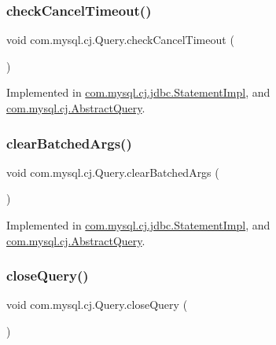 \subsubsection{\texorpdfstring{check\+Cancel\+Timeout()}{checkCancelTimeout()}}
{\footnotesize\ttfamily void com.\+mysql.\+cj.\+Query.\+check\+Cancel\+Timeout (\begin{DoxyParamCaption}{ }\end{DoxyParamCaption})}



Implemented in \mbox{\hyperlink{classcom_1_1mysql_1_1cj_1_1jdbc_1_1_statement_impl_a8409855892d4f4c55a35f3444f50825c}{com.\+mysql.\+cj.\+jdbc.\+Statement\+Impl}}, and \mbox{\hyperlink{classcom_1_1mysql_1_1cj_1_1_abstract_query_a995c89e6b09f3bff41729b384c9b1db3}{com.\+mysql.\+cj.\+Abstract\+Query}}.

\mbox{\label{interfacecom_1_1mysql_1_1cj_1_1_query_a72ab11f1338a67459c15b31d1e808b14}} 
\subsubsection{\texorpdfstring{clear\+Batched\+Args()}{clearBatchedArgs()}}
{\footnotesize\ttfamily void com.\+mysql.\+cj.\+Query.\+clear\+Batched\+Args (\begin{DoxyParamCaption}{ }\end{DoxyParamCaption})}



Implemented in \mbox{\hyperlink{classcom_1_1mysql_1_1cj_1_1jdbc_1_1_statement_impl_a42618e455d715cde9a92efbc6922b252}{com.\+mysql.\+cj.\+jdbc.\+Statement\+Impl}}, and \mbox{\hyperlink{classcom_1_1mysql_1_1cj_1_1_abstract_query_a01ad2cac9e9df0edd3594de00c6b9a2e}{com.\+mysql.\+cj.\+Abstract\+Query}}.

\mbox{\label{interfacecom_1_1mysql_1_1cj_1_1_query_a5808add7bd2bffa44c7532995b16e442}} 
\subsubsection{\texorpdfstring{close\+Query()}{closeQuery()}}
{\footnotesize\ttfamily void com.\+mysql.\+cj.\+Query.\+close\+Query (\begin{DoxyParamCaption}{ }\end{DoxyParamCaption})}



